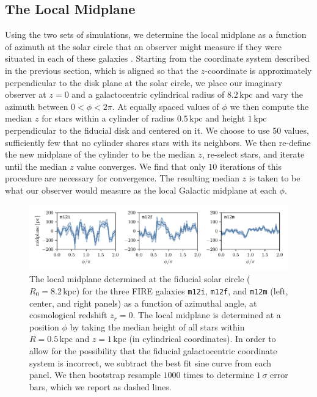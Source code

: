 \documentclass[twocolumn]{aastex62}
\newcommand{\kpc}{\text{kpc}}
\newcommand{\mi}{\texttt{m12i}}
\newcommand{\mf}{\texttt{m12f}}
\newcommand{\mm}{\texttt{m12m}}
\newcommand{\z}{z_r}
\begin{document}
\subsection{The Local Midplane} \label{ssec:local_midplane}
Using the two sets of simulations, we determine the local midplane as a function of azimuth at the solar circle
that an observer might measure if they were situated in each of these
galaxies%
. Starting from the coordinate system
described in the previous section, which is 
aligned so that the
$z$-coordinate is approximately perpendicular to the disk plane at the solar circle, we place our imaginary
observer at $z=0$ and a galactocentric cylindrical radius of $8.2\,\kpc$ and
vary the azimuth between $0<\phi<2\pi$. 
At equally spaced values of 
$\phi$ we then compute the median $z$ for stars within a cylinder of radius $0.5\,\kpc$ and
height $1\,\kpc$ perpendicular to the fiducial disk and centered on it. We choose to use 50 values, sufficiently few that no cylinder shares stars with its neighbors.
We then re-define the new
midplane of the cylinder to be the median $z$, re-select stars, and iterate
until the median $z$ value converges. We find that only $10$ iterations of
this procedure are necessary for convergence. The resulting median $z$ is
taken to be what our observer would measure as the local Galactic midplane at
each $\phi$.

\begin{figure}[htb!]
\begin{center}
\includegraphics[width=\textwidth]{fig/midplane_fit.pdf}
\end{center}
\caption{The local midplane determined at the fiducial solar circle
($R_0 = 8.2\,\kpc$) for the three FIRE galaxies \mi{}, \mf{}, and \mm{} (left,
center, and right panels) as a function of azimuthal angle, at cosmological redshift $\z =0$. The local midplane is determined at
a position $\phi$ by taking the median height of all stars within
$R=0.5\,\kpc$ and $z=1\,\kpc$ (in cylindrical coordinates). 
In order to allow for the possibility that the fiducial
galactocentric coordinate system is incorrect, we subtract the best fit sine
curve from each panel. We then bootstrap resample $1000$ times to determine
$1\,\sigma $ error bars, which we report as dashed lines.}
\label{fig:midplane}
\end{figure}
\end{document}
